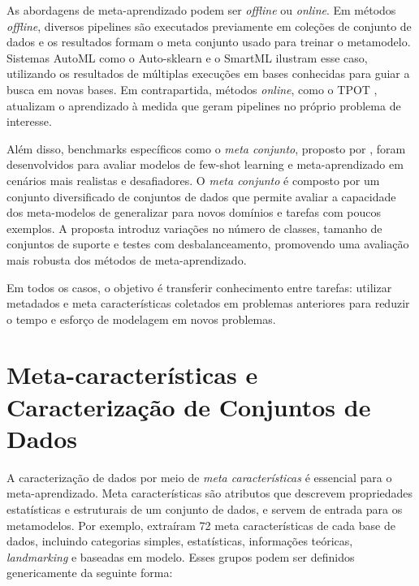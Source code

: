 As abordagens de meta-aprendizado podem ser \emph{offline} ou \emph{online}. Em métodos \emph{offline}, diversos pipelines são executados previamente em coleções de conjunto de dados e os resultados formam o meta conjunto usado para treinar o metamodelo. Sistemas AutoML como o Auto-sklearn  e o SmartML  ilustram esse caso, utilizando os resultados de múltiplas execuções em bases conhecidas para guiar a busca em novas bases. Em contrapartida, métodos \emph{online}, como o TPOT \cite{Olson2016TPOT}, atualizam o aprendizado à medida que geram pipelines no próprio problema de interesse.

Além disso, benchmarks específicos como o \textit{meta conjunto}, proposto por , foram desenvolvidos para avaliar modelos de few-shot learning e meta-aprendizado em cenários mais realistas e desafiadores. O \textit{meta conjunto} é composto por um conjunto diversificado de conjuntos de dados que permite avaliar a capacidade dos meta-modelos de generalizar para novos domínios e tarefas com poucos exemplos. A proposta introduz variações no número de classes, tamanho de conjuntos de suporte e testes com desbalanceamento, promovendo uma avaliação mais robusta dos métodos de meta-aprendizado.

Em todos os casos, o objetivo é transferir conhecimento entre tarefas: utilizar metadados e meta características coletados em problemas anteriores para reduzir o tempo e esforço de modelagem em novos problemas.

\section{Meta-características e Caracterização de Conjuntos de Dados}
A caracterização de dados por meio de \emph{meta características} é essencial para o meta-aprendizado. Meta características são atributos que descrevem propriedades estatísticas e estruturais de um conjunto de dados, e servem de entrada para os metamodelos. Por exemplo,  extraíram 72 meta características de cada base de dados, incluindo categorias simples, estatísticas, informações teóricas, \emph{landmarking} e baseadas em modelo. Esses grupos podem ser definidos genericamente da seguinte forma:

